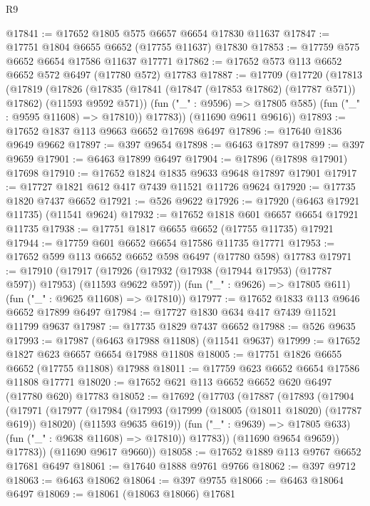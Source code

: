 \begin{lexlean}{R9}
\begin{coremodule}
@17841 := @17652 @1805 @575 @6657 @6654 @17830 @11637
@17847 := @17751 @1804 @6655 @6652 (@17755 @11637) @17830
@17853 := @17759 @575 @6652 @6654 @17586 @11637 @17771
@17862 := @17652 @573 @113 @6652 @6652 @572 @6497 (@17780 @572) @17783
@17887 := @17709
    (@17720
      (@17813
        (@17819
          (@17826
            (@17835 (@17841 (@17847 (@17853 @17862) (@17787 @571)) @17862) (@11593 @9592 @571))
            (fun ("_" : @9596) => @17805 @585)
            (fun ("_" : @9595 @11608) => @17810))
          @17783))
      (@11690 @9611 @9616))
@17893 := @17652 @1837 @113 @9663 @6652 @17698 @6497
@17896 := @17640 @1836 @9649 @9662
@17897 := @397 @9654
@17898 := @6463 @17897
@17899 := @397 @9659
@17901 := @6463 @17899 @6497
@17904 := @17896 (@17898 @17901) @17698
@17910 := @17652 @1824 @1835 @9633 @9648 @17897 @17901
@17917 := @17727 @1821 @612 @417 @7439 @11521 @11726 @9624
@17920 := @17735 @1820 @7437 @6652
@17921 := @526 @9622
@17926 := @17920 (@6463 @17921 @11735) (@11541 @9624)
@17932 := @17652 @1818 @601 @6657 @6654 @17921 @11735
@17938 := @17751 @1817 @6655 @6652 (@17755 @11735) @17921
@17944 := @17759 @601 @6652 @6654 @17586 @11735 @17771
@17953 := @17652 @599 @113 @6652 @6652 @598 @6497 (@17780 @598) @17783
@17971 := @17910
    (@17917
      (@17926 (@17932 (@17938 (@17944 @17953) (@17787 @597)) @17953) (@11593 @9622 @597))
      (fun ("_" : @9626) => @17805 @611)
      (fun ("_" : @9625 @11608) => @17810))
@17977 := @17652 @1833 @113 @9646 @6652 @17899 @6497
@17984 := @17727 @1830 @634 @417 @7439 @11521 @11799 @9637
@17987 := @17735 @1829 @7437 @6652
@17988 := @526 @9635
@17993 := @17987 (@6463 @17988 @11808) (@11541 @9637)
@17999 := @17652 @1827 @623 @6657 @6654 @17988 @11808
@18005 := @17751 @1826 @6655 @6652 (@17755 @11808) @17988
@18011 := @17759 @623 @6652 @6654 @17586 @11808 @17771
@18020 := @17652 @621 @113 @6652 @6652 @620 @6497 (@17780 @620) @17783
@18052 := @17692
    (@17703
      (@17887
        (@17893
          (@17904
            (@17971
              (@17977
                (@17984
                  (@17993
                    (@17999 (@18005 (@18011 @18020) (@17787 @619)) @18020)
                    (@11593 @9635 @619))
                  (fun ("_" : @9639) => @17805 @633)
                  (fun ("_" : @9638 @11608) => @17810))
                @17783))
            (@11690 @9654 @9659))
          @17783))
      (@11690 @9617 @9660))
@18058 := @17652 @1889 @113 @9767 @6652 @17681 @6497
@18061 := @17640 @1888 @9761 @9766
@18062 := @397 @9712
@18063 := @6463 @18062
@18064 := @397 @9755
@18066 := @6463 @18064 @6497
@18069 := @18061 (@18063 @18066) @17681

\end{coremodule}
\end{lexlean}
